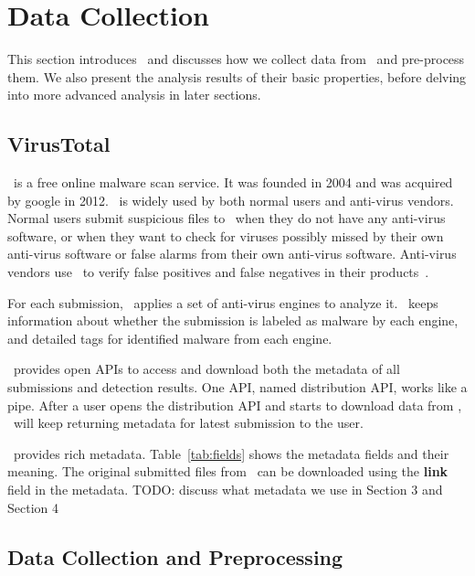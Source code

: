 \section{Data Collection}
\label{sec:meth}

This section introduces \vt\ and 
discusses how we collect data from \vt\ and pre-process them.
We also present the analysis results of their basic properties, 
before delving into more advanced analysis in later sections.



\subsection{VirusTotal}

\vt\ is a free online malware scan service.
It was founded in 2004 and was acquired by google in 2012. 
\vt\ is widely used by both normal users and anti-virus vendors.
Normal users submit suspicious files to \vt\ when they do not have any anti-virus software, 
or when they want to check for viruses possibly missed by their own anti-virus software 
or false alarms from their own anti-virus software.  
Anti-virus vendors use \vt\ to verify false positives and false negatives in their products~\cite{huangvt2016bigdata, neeles}.

For each submission, \vt\ applies a set of anti-virus engines to analyze it. 
\vt\ keeps information about whether the submission is labeled as malware by each engine, 
and detailed tags for identified malware from each engine. 

\vt\ provides open APIs to access and download both the metadata of all submissions and detection results.
One API, named distribution API, works like a pipe.
After a user opens the distribution API and starts to download data from \vt, 
\vt\ will keep returning metadata for latest submission to the user. 

\vt\ provides rich metadata.
Table~\ref{tab:fields} shows the metadata fields and their meaning.  
The original submitted files from \vt\ can be downloaded using the {\bf link} field in the metadata.
{\color{red} TODO: discuss what metadata we use in Section 3 and Section 4}



\subsection{Data Collection and Preprocessing}

